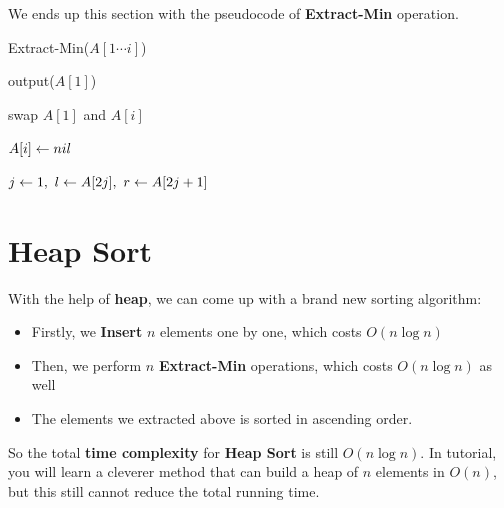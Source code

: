 \begin{spacing}{1.3}
    We ends up this section with the pseudocode of {\bf Extract-Min} operation.

    \begin{algorithm*}[htbp]
        \caption{Extract-Min($A[1\cdots i]$)}

        output($A[1]$) \qquad {}

        swap $A[1]$ and $A[i]$\qquad {}

        $A[i]\leftarrow nil$\qquad {}


        $j\leftarrow 1,\ l\leftarrow A[2j],\ r\leftarrow A[2j+1]$ \qquad {}
    \end{algorithm*}


    \vspace{0.3in}
    \section{Heap Sort}

    With the help of {\bf heap}, we can come up with a brand new sorting algorithm:
    \begin{itemize}
        \item Firstly, we {\bf Insert} $n$ elements one by one, which costs $O(n\log n)$
        \item Then, we perform $n$ {\bf Extract-Min} operations, which costs $O(n\log n)$ as well
        \item The elements we extracted above is sorted in ascending order.
    \end{itemize}

    So the total {\bf time complexity} for {\bf Heap Sort} is still $O(n\log n)$. 
    In tutorial, you will learn a cleverer method that can build a heap of $n$ elements 
    in $O(n)$, but this still cannot reduce the total running time.


\end{spacing}

